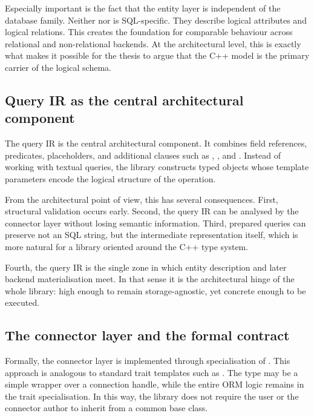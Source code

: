 Especially important is the fact that the entity layer is independent of the database family. Neither  nor  is SQL-specific. They describe logical attributes and logical relations. This creates the foundation for comparable behaviour across relational and non-relational backends. At the architectural level, this is exactly what makes it possible for the thesis to argue that the C++ model is the primary carrier of the logical schema.

\subsection{Query IR as the central architectural component}

The query IR is the central architectural component. It combines field references, predicates, placeholders, and additional clauses such as , , and . Instead of working with textual queries, the library constructs typed objects whose template parameters encode the logical structure of the operation.

From the architectural point of view, this has several consequences. First, structural validation occurs early. Second, the query IR can be analysed by the connector layer without losing semantic information. Third, prepared queries can preserve not an SQL string, but the intermediate representation itself, which is more natural for a library oriented around the C++ type system.

Fourth, the query IR is the single zone in which entity description and later backend materialisation meet. In that sense it is the architectural hinge of the whole library: high enough to remain storage-agnostic, yet concrete enough to be executed.

\subsection{The connector layer and the formal contract}

Formally, the connector layer is implemented through specialisation of . This approach is analogous to standard trait templates such as . The type  may be a simple wrapper over a connection handle, while the entire ORM logic remains in the trait specialisation. In this way, the library does not require the user or the connector author to inherit from a common base class.

